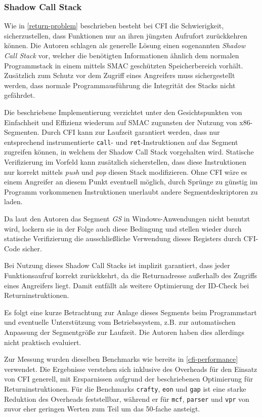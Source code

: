 \documentclass[11pt]{article}
\begin{document}
\subsubsection{Shadow Call Stack}
\label{return-solution}

Wie in \ref{return-problem} beschrieben besteht bei CFI die Schwierigkeit,
sicherzustellen, dass Funktionen nur an ihren jüngsten Aufrufort zurückkehren
können. Die Autoren schlagen als generelle Lösung einen sogenannten
\emph{Shadow Call Stack} vor, welcher die benötigten Informationen ähnlich dem
normalen Programmstack in einem mittels SMAC geschützten Speicherbereich
vorhält. Zusätzlich zum Schutz vor dem Zugriff eines Angreifers muss
sichergestellt werden, dass normale Programmausführung die Integrität des
Stacks nicht gefährdet.

Die beschriebene Implementierung verzichtet unter den Gesichtspunkten von
Einfachheit und Effizienz wiederum auf SMAC zugunsten der Nutzung von
x86-Segmenten. Durch CFI kann zur Laufzeit garantiert werden, dass nur
entsprechend instrumentierte \texttt{call}- und \texttt{ret}-Instruktionen auf
das Segment zugreifen können, in welchem der Shadow Call Stack vorgehalten
wird. Statische Verifizierung im Vorfeld kann zusätzlich sicherstellen, dass
diese Instruktionen nur korrekt mittels \emph{push} und \emph{pop} diesen Stack
modifizieren. Ohne CFI wäre es einem Angreifer an diesem Punkt eventuell
möglich, durch Sprünge zu günstig im Programm vorkommenen Instruktionen
unerlaubt andere Segmentdeskriptoren zu laden.

Da laut den Autoren das Segment \emph{GS} in Windows-Anwendungen nicht benutzt
wird, lockern sie in der Folge auch diese Bedingung und stellen wieder durch
statische Verifizierung die ausschließliche Verwendung dieses Registers durch
CFI-Code sicher.

Bei Nutzung dieses Shadow Call Stacks ist implizit garantiert, dass jeder
Funktionsaufruf korrekt zurückkehrt, da die Returnadresse außerhalb des
Zugriffs eines Angreifers liegt. Damit entfällt als weitere Optimierung der
ID-Check bei Returninstruktionen.

Es folgt eine kurze Betrachtung zur Anlage dieses Segments beim Programmstart
und eventuelle Unterstützung vom Betriebssystem, z.B. zur automatischen
Anpassung der Segmentgröße zur Laufzeit. Die Autoren haben dies allerdings
nicht praktisch evaluiert.

Zur Messung wurden dieselben Benchmarks wie bereits in \ref{cfi-performance}
verwendet. Die Ergebnisse verstehen sich inklusive des Overheads für den
Einsatz von CFI generell, mit Ersparnissen aufgrund der beschriebenen
Optimierung für Returninstruktionen. Für die Benchmarks \texttt{crafty},
\texttt{eon} und \texttt{gap} ist eine starke Reduktion des Overheads
feststellbar, während er für \texttt{mcf}, \texttt{parser} und \texttt{vpr} von
zuvor eher geringen Werten zum Teil um das 50-fache ansteigt.
\end{document}
